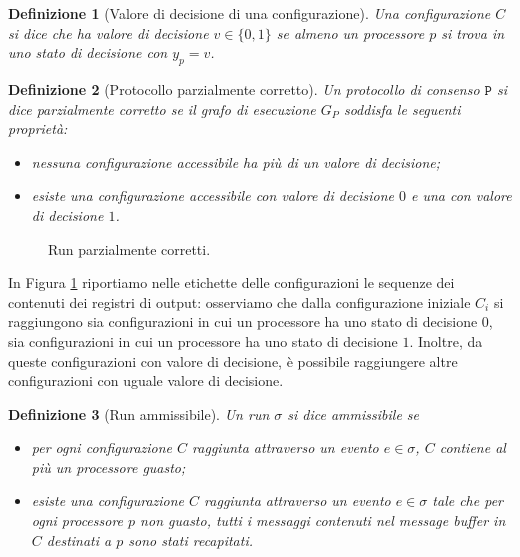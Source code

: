 \documentclass{article}
\newtheorem{definizione}{Definizione}
\begin{document}
\begin{definizione}[Valore di decisione di una configurazione]
  Una configurazione $C$ si dice che \emph{ha valore di decisione} $v
  \in \{0,1\}$ se almeno un processore $p$ si trova in uno stato di
  decisione con $y_p=v$.
\end{definizione}

\begin{definizione}[Protocollo parzialmente corretto]
  Un protocollo di consenso $\mathtt{P}$ si dice \emph{parzialmente corretto}
  se il grafo di esecuzione $G_P$ soddisfa le seguenti proprietà:
\begin{itemize}
\item nessuna configurazione accessibile ha più di un valore di
  decisione;
\item esiste una configurazione accessibile con valore di decisione
  $0$ e una con valore di decisione $1$.
\end{itemize}  
\end{definizione}

\begin{figure}[!h]
  \centering \caption{Run
    parzialmente corretti.}\label{fig:parzialmenteCorretto}
\end{figure}

In Figura \ref{fig:parzialmenteCorretto} riportiamo nelle etichette
delle configurazioni le sequenze dei contenuti dei registri di output:
osserviamo che dalla configurazione iniziale $C_i$ si raggiungono sia
configurazioni in cui un processore ha uno stato di decisione $0$, sia
configurazioni in cui un processore ha uno stato di decisione
$1$. Inoltre, da queste configurazioni con valore di decisione, è
possibile raggiungere altre configurazioni con uguale valore di
decisione.

\begin{definizione}[Run ammissibile]
  Un run $\sigma$ si dice \emph{ammissibile} se 
  \begin{itemize}
  \item per ogni configurazione $C$ raggiunta attraverso un evento
    $e\in \sigma$, $C$ contiene al più un processore guasto;
  \item esiste una configurazione $C$ raggiunta attraverso un evento
    $e\in \sigma$ tale che per ogni processore $p$ non guasto, tutti i
    messaggi contenuti nel message buffer in $C$ destinati a $p$ sono
    stati recapitati.
  \end{itemize}
\end{definizione}
\end{document}
